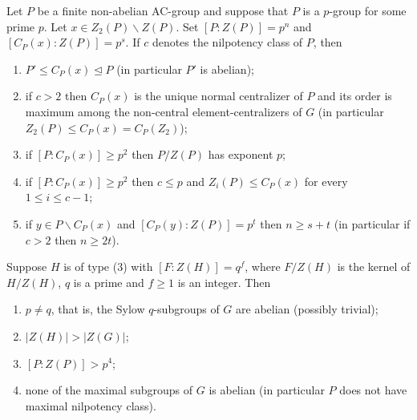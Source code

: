 \documentclass[10pt,a4paper]{amsart}
\newcommand{\norm}{\mathrel{\unlhd}}
\begin{document}
\begin{lemma}\label{lem:p-groups}
Let $P$ be a finite non-abelian AC-group and suppose that $P$ is a $p$-group for some prime $p$. Let $x \in Z_2(P) \backslash Z(P)$. Set $[P \colon Z(P)] = p^n$ and $[C_P(x) \colon Z(P)] = p^s$. If $c$ denotes the nilpotency class of $P$, then
\begin{enumerate}
\item $P' \leq C_P(x) \norm P$ (in particular $P'$ is abelian);
\item if $c > 2$ then $C_P(x)$ is the unique normal centralizer of $P$ and its order is maximum among the non-central element-centralizers of $G$ (in particular $Z_2(P) \leq C_P(x) = C_P(Z_2)$);
\item if $[P \colon C_P(x)] \geq p^2$ then $P/Z(P)$ has exponent $p$;
\item if $[P \colon C_P(x)] \geq p^2$ then $c \leq p$ and $Z_i(P) \leq C_P(x)$ for every $1 \leq i \leq c-1$;
\item if $y \in P \backslash C_P(x)$ and $[C_P(y) \colon Z(P)] = p^t$ then $n\geq s+t$ (in particular if $c > 2$ then $n \geq 2t$).
\end{enumerate}

\end{lemma}

\begin{theorem}\label{exception} 
Suppose $H$ is of type (3) with $[F \colon Z(H)] = q^f$, where $F/Z(H)$ is the kernel of $H/Z(H)$, $q$ is a prime and $f\geq 1$ is an integer. Then
\begin{enumerate}
\item $p \neq q$, that is, the Sylow $q$-subgroups of $G$ are abelian (possibly trivial);
\item $|Z(H)| > |Z(G)|$;
\item $[P \colon Z(P)] > p^4$;
\item none of the maximal subgroups of $G$ is abelian (in particular $P$ does not have maximal nilpotency class). 
\end{enumerate}
\end{theorem}
\end{document}
